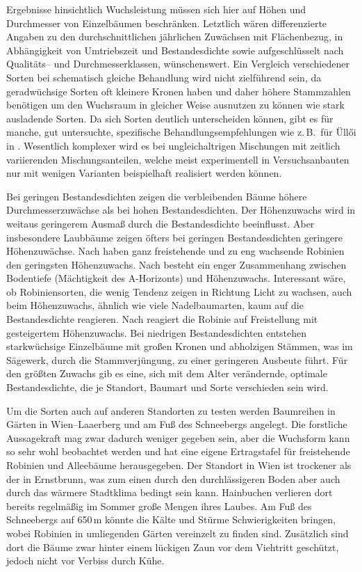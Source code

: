\documentclass[twocolumn]{scrartcl}
\begin{document}
Ergebnisse hinsichtlich Wuchsleistung müssen sich hier auf Höhen und
Durchmesser von Einzelbäumen beschränken.  Letztlich wären
differenzierte Angaben zu den durchschnittlichen jährlichen Zuwächsen
mit Flächenbezug, in Abhängigkeit von Umtriebszeit und Bestandesdichte
sowie aufgeschlüsselt nach Qualitäts-- und Durchmesserklassen,
wünschenswert.  Ein Vergleich verschiedener Sorten bei schematisch
gleiche Behandlung wird nicht zielführend sein, da geradwüchsige
Sorten oft kleinere Kronen haben \citep{bujtas1984robinie} und daher
höhere Stammzahlen benötigen \citep{keresztesi1974robinie} um den
Wuchsraum in gleicher Weise ausnutzen zu können wie stark ausladende
Sorten. Da sich Sorten deutlich unterscheiden können, gibt es für
manche, gut untersuchte, spezifische Behandlungsempfehlungen wie
z.\,B.\ für Üllői in \citet{redei2020ulloi}. Wesentlich komplexer wird
es bei ungleichaltrigen Mischungen mit zeitlich variierenden
Mischungsanteilen, welche meist experimentell in Versuchsanbauten nur
mit wenigen Varianten beispielhaft realisiert werden können.

Bei geringen Bestandesdichten zeigen die verbleibenden Bäume höhere
Durchmesserzuwächse als bei hohen Bestandesdichten. Der Höhenzuwachs
wird in weitaus geringerem Ausmaß durch die Bestandesdichte
beeinflusst. Aber insbesondere Laubbäume zeigen öfters bei geringen
Bestandesdichten geringere Höhenzuwächse.
Nach \citet[S.~55]{bluemke1955robinie} haben ganz freistehende und zu eng
wachsende Robinien den geringsten Höhenzuwachs.
Nach \citet{roberts1939robinieHoehenzuwachs} besteht ein enger Zusammenhang
zwischen Bodentiefe (Mächtigkeit des A-Horizonts) und Höhenzuwachs.
Interessant wäre, ob
Robiniensorten, die wenig Tendenz zeigen in Richtung Licht zu wachsen,
auch beim Höhenzuwachs, ähnlich wie viele Nadelbaumarten, kaum auf die
Bestandesdichte reagieren.
Nach \citet[S.~7]{roach1958robinie} reagiert die Robinie auf
Freistellung mit gesteigertem Höhenzuwachs.
Bei niedrigen Bestandesdichten entstehen
starkwüchsige Einzelbäume mit großen Kronen und abholzigen Stämmen,
was im Sägewerk, durch die Stammverjüngung, zu einer geringeren
Ausbeute führt. Für den größten Zuwachs gib es eine, sich mit dem
Alter verändernde, optimale Bestandesdichte, die je Standort, Baumart
und Sorte verschieden sein wird.

Um die Sorten auch auf anderen Standorten zu testen werden Baumreihen in Gärten
in Wien--Laaerberg und am Fuß des Schneebergs angelegt. Die forstliche
Aussagekraft mag zwar dadurch weniger gegeben sein, aber die Wuchsform
kann so sehr wohl beobachtet werden und \citet{fekete1931robinieErtragstafel}
hat eine eigene Ertragstafel für freistehende Robinien und Alleebäume
herausgegeben.
Der Standort in Wien ist
trockener als der in Ernstbrunn, was zum einen durch den durchlässigeren Boden
aber auch durch das wärmere Stadtklima bedingt sein kann. Hainbuchen verlieren
dort bereits regelmäßig im Sommer große Mengen ihres Laubes. Am Fuß des
Schneebergs auf 650\,m könnte die Kälte und Stürme Schwierigkeiten bringen,
wobei Robinien in umliegenden Gärten vereinzelt zu finden sind. Zusätzlich sind
dort die Bäume zwar hinter einem lückigen Zaun vor dem Viehtritt geschützt,
jedoch nicht vor Verbiss durch Kühe.
\end{document}
